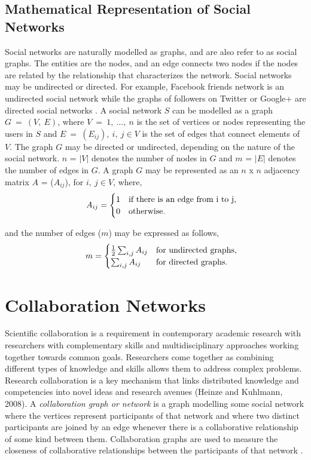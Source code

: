 \documentclass[12pt]{article}
\theoremstyle{definition}
\begin{document}
\subsection{Mathematical Representation of Social Networks}
Social networks are naturally modelled as graphs, and are also refer to as social graphs. The entities are the nodes, and an edge connects two nodes if the nodes are related by the relationship that characterizes the network. Social networks may be undirected or directed. For example, Facebook friends network is an undirected social network while the graphs of followers on Twitter or Google+ are directed social networks \cite{leskovec_rajaraman_ullman_2014}. A social network $S$ can be modelled as a graph $G\ =\ (V,\ E)$, where $V\ =\ {1,\ \ldots,\ n}$ is the set of vertices or nodes representing the users in $S$ and $E\ =\ (E_{ij}),\ i,\ j \in V$ is the set of edges that connect elements of $V$. The graph $G$ may be directed or undirected, depending on the nature of the social network. $n$ = $|V|$ denotes the number of nodes in $G$ and $m$ = $|E|$ denotes the number of edges in $G$. A graph $G$ may be represented as an $n$ x $n$ adjacency matrix $A$ = ($A_{ij}$), for $i,\ j \in V$, where,
\begin{equation}
\indent A_{ij} =
\begin{cases}
1 & \text{if there is an edge from i to j},\\
0 & \text{otherwise}.
\end{cases} \label{1}
\end{equation}

and the number of edges ($m$) may be expressed as follows,
\begin{equation}
\indent m =
\begin{cases}
\frac{1}{2} \sum_{i, j}  A_{ij} & \text{for undirected graphs},\\
\sum_{i, j}  A_{ij} & \text{for directed graphs}.
\end{cases} \label{2}
\end{equation}

\section{Collaboration Networks} \label{collabNws}

Scientific collaboration is a requirement in contemporary academic research with researchers with complementary skills and multidisciplinary approaches working together towards common goals. Researchers come together as combining different types of knowledge and skills allows them to address complex problems. Research collaboration is a key mechanism that links distributed knowledge and competencies into novel ideas and research avenues (Heinze and Kuhlmann, 2008). A \textit{collaboration graph or network} is a graph modelling some social network where the vertices represent participants of that network and where two distinct participants are joined by an edge whenever there is a collaborative relationship of some kind between them. Collaboration graphs are used to measure the closeness of collaborative relationships between the participants of that network \cite{yegnanarayanan2011note}. 
\end{document}

